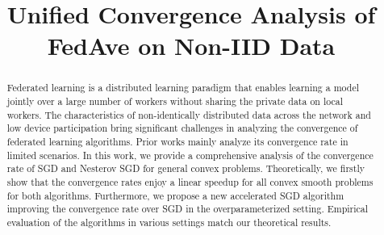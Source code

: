 \documentclass{article}
\title{Unified Convergence Analysis of FedAve on Non-IID Data}
\author{}
\begin{document}
\maketitle

\begin{abstract}
Federated learning is a distributed learning paradigm that enables learning a
model jointly over a large number of workers without sharing the private data
on local workers. The characteristics of non-identically distributed data
across the network and low device participation bring significant challenges
in analyzing the convergence of federated learning algorithms. Prior works
mainly analyze its convergence rate in limited scenarios.
In this work, we provide a comprehensive analysis of the convergence rate of SGD and Nesterov SGD for general convex problems.
Theoretically, we firstly show 
that the convergence rates enjoy a linear speedup for
all convex smooth problems for both algorithms.
Furthermore, we propose a new accelerated SGD algorithm improving the convergence rate over SGD in the overparameterized setting. 
Empirical evaluation of the algorithms in various settings match our theoretical
results.
\end{abstract}





\newpage



\newpage
\appendix

% 




\small


\end{document}
